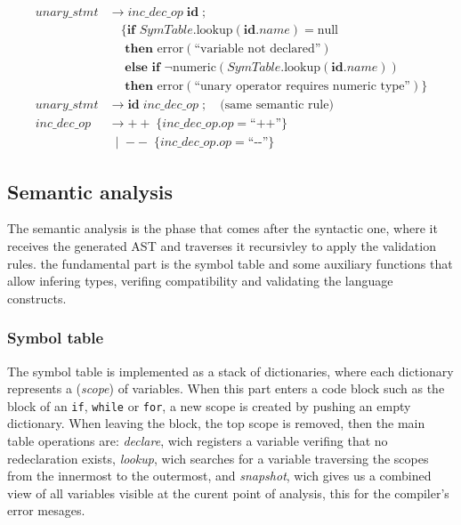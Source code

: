 \documentclass[letterpaper,12pt,oneside]{article}
\begin{document}
\begin{align*}
unary\_stmt &\rightarrow inc\_dec\_op \; \mathbf{id} \; \mathbf{;} \\
           &\quad \{\textbf{if } SymTable.\text{lookup}(\mathbf{id}.name) = \text{null} \\
           &\quad \textbf{ then } \text{error}(\text{``variable not declared''}) \\
           &\quad \textbf{ else if } \neg\text{numeric}(SymTable.\text{lookup}(\mathbf{id}.name)) \\
           &\quad \textbf{ then } \text{error}(\text{``unary operator requires numeric type''})\} \\[6pt]
unary\_stmt &\rightarrow \mathbf{id} \; inc\_dec\_op \; \mathbf{;} \quad \text{(same semantic rule)} \\[8pt]
inc\_dec\_op &\rightarrow \mathbf{++} \;\{inc\_dec\_op.op = \text{``++''}\} \\
            &\;\mid\; \mathbf{-{}-} \;\{inc\_dec\_op.op = \text{``-{}-''}\}
\end{align*}


\subsection{Semantic analysis}

The semantic analysis is the phase that comes after the syntactic one, where it receives the generated AST and traverses it recursivley to apply the validation rules. the fundamental part is the symbol table and some auxiliary functions that allow infering types, verifing compatibility and validating the language constructs.

\subsubsection{Symbol table}

The symbol table is implemented as a stack of dictionaries, where each dictionary represents a (\textit{scope}) of variables. When this part enters a code block such as the block of an \texttt{if}, \texttt{while} or \texttt{for}, a new scope is created by pushing an empty dictionary. When leaving the block, the top scope is removed, then the main table operations are: \textit{declare}, wich registers a variable verifing that no redeclaration exists, \textit{lookup}, wich searches for a variable traversing the scopes from the innermost to the outermost, and \textit{snapshot}, wich gives us a combined view of all variables visible at the curent point of analysis, this for the compiler's error mesages.
\end{document}
